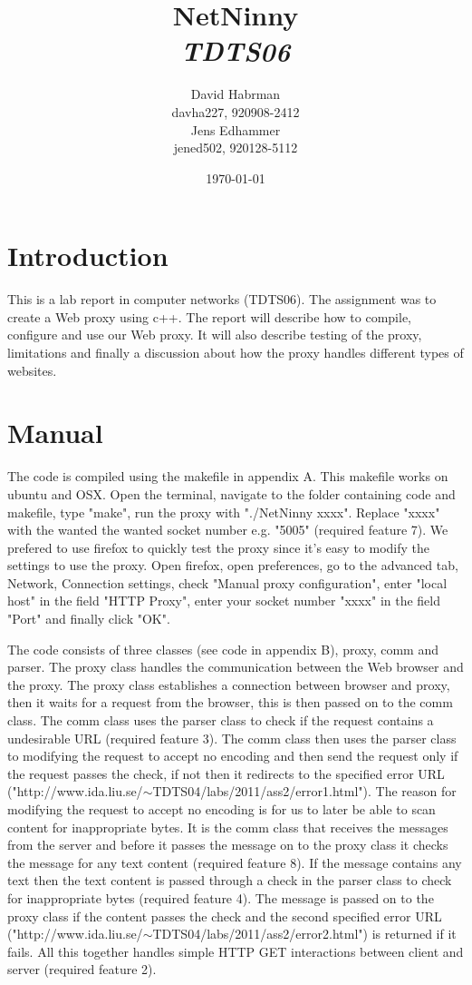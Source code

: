 \documentclass[10pt]{article}
\title{NetNinny\\
\emph{TDTS06}}
\author{David Habrman \\ davha227, 920908-2412\\
Jens Edhammer \\ jened502, 920128-5112 }
\date{\today}
\begin{document}
\maketitle

\newpage
\tableofcontents
\newpage

\section{Introduction}
This is a lab report in computer networks (TDTS06). The assignment was
to create a Web proxy using c++. The report will describe how to compile,
configure and use our Web proxy. It will also describe testing of the proxy,
limitations and finally a discussion about how the proxy handles different
types of websites.

\section{Manual}
The code is compiled using the makefile in appendix A. This makefile works on
ubuntu and OSX. Open the terminal, navigate to the folder containing code and
makefile, type "make", run the proxy with "./NetNinny xxxx". Replace "xxxx"
with the wanted the wanted socket number e.g. "5005" (required feature 7).
We prefered to use firefox to quickly test the proxy since it's easy to
modify the settings to use the proxy. Open firefox, open preferences, go to
the advanced tab, Network, Connection settings, check
"Manual proxy configuration", enter "local host" in the field "HTTP Proxy",
enter your socket number "xxxx" in the field "Port" and finally click "OK".

The code consists of three classes (see code in appendix B), proxy, comm and
parser. The proxy class handles the communication between the Web browser and
the proxy. The proxy class establishes a connection between browser and proxy,
then it waits for a request from the browser, this is then passed on to the comm
class. The comm class uses the parser class to check if the request contains a
undesirable URL (required feature 3). The comm class then uses the parser class
to modifying the request to accept no encoding and then send the request only if
the request passes the check, if not then it redirects to the specified error URL
("http://www.ida.liu.se/$\sim$TDTS04/labs/2011/ass2/error1.html"). The reason
for modifying the request to accept no encoding is for us to later be able to
scan content for inappropriate bytes.
It is the comm class that receives the messages from the server and before
it passes the message on to the proxy class it checks the message for any
text content (required feature 8). If the message contains any text then the
text content is passed through a check in the parser class to check for
inappropriate bytes (required feature 4). The message is passed on to the
proxy class if the content passes the check and the second specified error URL
("http://www.ida.liu.se/$\sim$TDTS04/labs/2011/ass2/error2.html") is returned if it
fails. All this together handles simple HTTP GET interactions between client
and server (required feature 2).
\end{document}
